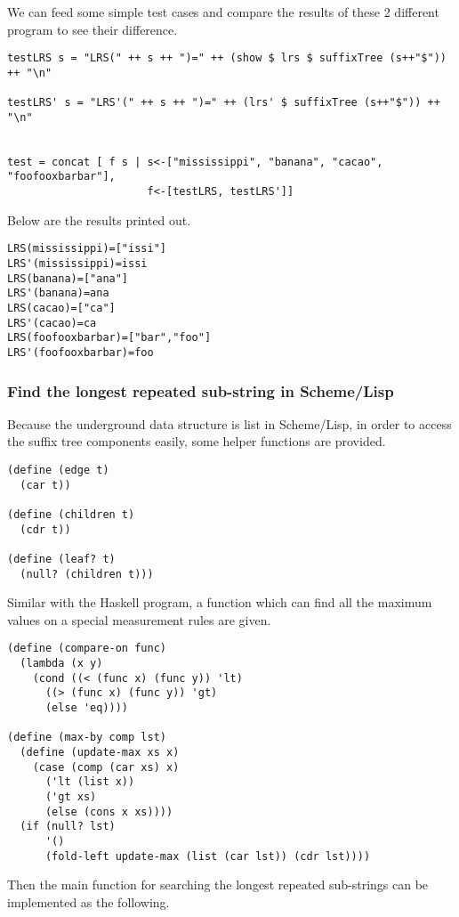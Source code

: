 \documentclass{article}
\begin{document}
We can feed some simple test cases and compare the results of 
these 2 different program to see their difference.

\begin{lstlisting}
testLRS s = "LRS(" ++ s ++ ")=" ++ (show $ lrs $ suffixTree (s++"$")) ++ "\n"

testLRS' s = "LRS'(" ++ s ++ ")=" ++ (lrs' $ suffixTree (s++"$")) ++ "\n"


test = concat [ f s | s<-["mississippi", "banana", "cacao", "foofooxbarbar"],
                      f<-[testLRS, testLRS']]
\end{lstlisting} %

Below are the results printed out.

\begin{verbatim}
LRS(mississippi)=["issi"]
LRS'(mississippi)=issi
LRS(banana)=["ana"]
LRS'(banana)=ana
LRS(cacao)=["ca"]
LRS'(cacao)=ca
LRS(foofooxbarbar)=["bar","foo"]
LRS'(foofooxbarbar)=foo
\end{verbatim}

\subsubsection*{Find the longest repeated sub-string in Scheme/Lisp}
Because the underground data structure is list in Scheme/Lisp, 
in order to access the suffix tree components easily, some helper
functions are provided.

\lstset{language=lisp}
\begin{lstlisting}
(define (edge t)
  (car t))

(define (children t)
  (cdr t))

(define (leaf? t)
  (null? (children t)))
\end{lstlisting}

Similar with the Haskell program, a function which can find all
the maximum values on a special measurement rules are given.

\begin{lstlisting}
(define (compare-on func)
  (lambda (x y) 
    (cond ((< (func x) (func y)) 'lt)
	  ((> (func x) (func y)) 'gt)
	  (else 'eq))))

(define (max-by comp lst)
  (define (update-max xs x)
    (case (comp (car xs) x)
      ('lt (list x))
      ('gt xs)
      (else (cons x xs))))
  (if (null? lst)
      '()
      (fold-left update-max (list (car lst)) (cdr lst))))
\end{lstlisting}

Then the main function for searching the longest repeated sub-strings
can be implemented as the following.
\end{document}
